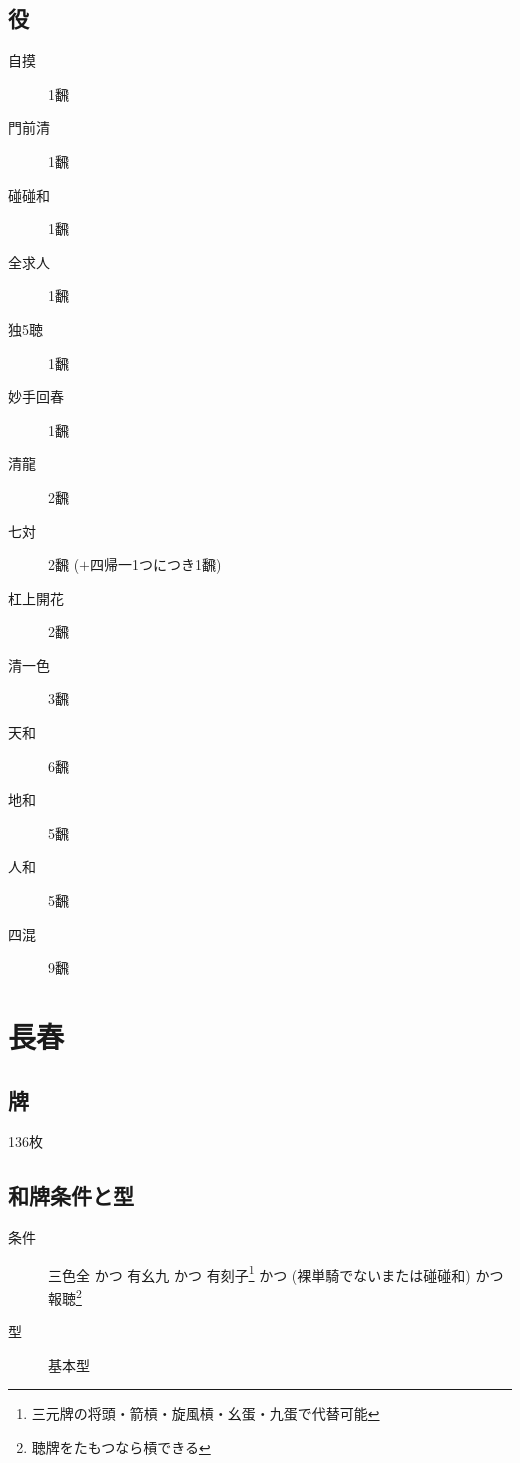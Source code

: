 \documentclass{ltjsarticle}
\begin{document}
\subsection{役}
\begin{description}
    \item[自摸] 1飜
    \item[門前清] 1飜
    \item[碰碰和] 1飜
    \item[全求人] 1飜
    \item[独5聴] 1飜
    \item[妙手回春] 1飜
    \item[清龍] 2飜
    \item[七対] 2飜 ($+$四帰一1つにつき1飜)
    \item[杠上開花] 2飜
    \item[清一色] 3飜
    \item[天和] 6飜
    \item[地和] 5飜
    \item[人和] 5飜
    \item[四混] 9飜
\end{description}
\section{長春}
\subsection{牌}136枚
\subsection{和牌条件と型}
\begin{description}
    \item[条件] 三色全 かつ 有幺九 かつ 有刻子\footnote{三元牌の将頭・箭槓・旋風槓・幺蛋・九蛋で代替可能} かつ (裸単騎でないまたは碰碰和) かつ 報聴\footnote{聴牌をたもつなら槓できる}
    \item[型] 基本型
\end{description}
\end{document}
